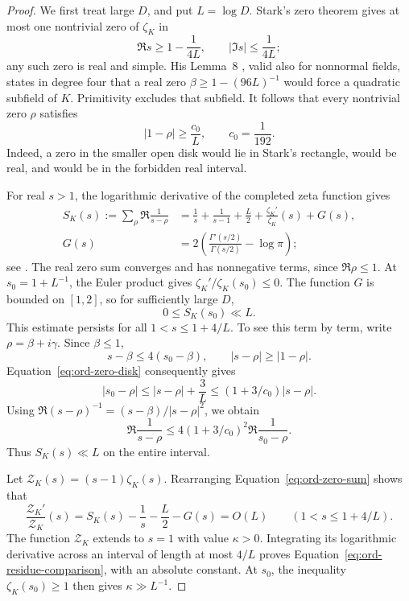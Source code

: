 \begin{proof}
We first treat large \(D\), and put \(L=\log D\).
Stark's zero theorem \cite[Lemma~3]{Stark1974} gives at most one
nontrivial zero of \(\zeta_K\) in
\[
 \Re s\ge1-\frac1{4L},\qquad |\Im s|\le\frac1{4L};
\]
any such zero is real and simple.  His
Lemma~8 \cite[Lemma~8]{Stark1974}, valid also for nonnormal fields,
states in degree four that a real zero
\(\beta\ge1-(96L)^{-1}\) would force a quadratic subfield of \(K\).
Primitivity excludes that subfield.  It follows that every nontrivial
zero \(\rho\) satisfies
\begin{equation}\label{eq:ord-zero-disk}
 |1-\rho|\ge \frac{c_0}{L},\qquad c_0=\frac1{192}.
\end{equation}
Indeed, a zero in the smaller open disk would lie in Stark's rectangle,
would be real, and would be in the forbidden real interval.

For real \(s>1\), the logarithmic derivative of the completed zeta
function gives
\begin{equation}\label{eq:ord-zero-sum}
\begin{aligned}
 S_K(s):=\sum_\rho\Re\frac1{s-\rho}
 &=\frac1s+\frac1{s-1}+\frac L2+
       \frac{\zeta_K'}{\zeta_K}(s)+G(s),\\
 G(s)&=2\left(\frac{\Gamma'(s/2)}{\Gamma(s/2)}-\log\pi\right);
\end{aligned}
\end{equation}
see \cite[Equation~(9)]{Stark1974}.  The real zero sum converges and
has nonnegative terms, since \(\Re\rho\le1\).  At \(s_0=1+L^{-1}\),
the Euler product gives \(\zeta_K'/\zeta_K(s_0)\le0\).  The function
\(G\) is bounded on \([1,2]\), so for sufficiently large \(D\),
\[
 0\le S_K(s_0)\ll L.
\]
This estimate persists for all \(1<s\le1+4/L\).  To see this term by
term, write \(\rho=\beta+i\gamma\).  Since \(\beta\le1\),
\[
 s-\beta\le4(s_0-\beta),\qquad
 |s-\rho|\ge|1-\rho|.
\]
Equation~\eqref{eq:ord-zero-disk} consequently gives
\[
 |s_0-\rho|\le |s-\rho|+\frac3L
              \le (1+3/c_0)|s-\rho|.
\]
Using \(\Re(s-\rho)^{-1}=(s-\beta)/|s-\rho|^2\), we obtain
\[
 \Re\frac1{s-\rho}
 \le4(1+3/c_0)^2\Re\frac1{s_0-\rho}.
\]
Thus \(S_K(s)\ll L\) on the entire interval.

Let \(\mathcal Z_K(s)=(s-1)\zeta_K(s)\).  Rearranging
Equation~\eqref{eq:ord-zero-sum} shows that
\[
 \frac{\mathcal Z_K'}{\mathcal Z_K}(s)
       =S_K(s)-\frac1s-\frac L2-G(s)=O(L)
       \qquad(1<s\le1+4/L).
\]
The function \(\mathcal Z_K\) extends to \(s=1\) with value
\(\kappa>0\).  Integrating its logarithmic derivative across an
interval of length at most \(4/L\) proves
Equation~\eqref{eq:ord-residue-comparison}, with an absolute constant.
At \(s_0\), the inequality \(\zeta_K(s_0)\ge1\) then gives
\(\kappa\gg L^{-1}\).


\end{proof}
